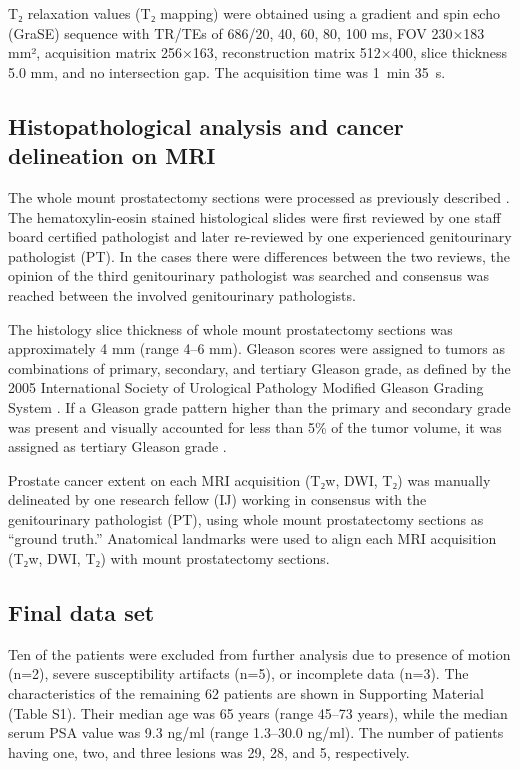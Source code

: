 T₂ relaxation values (T₂ mapping) were obtained using a gradient and spin echo
(GraSE) sequence with TR/TEs of 686/20, 40, 60, 80, 100 ms, FOV 230×183 mm²,
acquisition matrix 256×163, reconstruction matrix 512×400, slice thickness 5.0
mm, and no intersection gap. The acquisition time was 1~min 35~s.


\subsection{Histopathological analysis and cancer delineation on MRI}

The whole mount prostatectomy sections were processed as previously described
\citep{Jambor2015Evaluation, Jambor2015Rotating}. The hematoxylin-eosin stained
histological slides were first reviewed by one staff board certified pathologist
and later re-reviewed by one experienced genitourinary pathologist (PT). In the
cases there were differences between the two reviews, the opinion of the third
genitourinary pathologist was searched and consensus was reached between the
involved genitourinary pathologists.

The histology slice thickness of whole mount prostatectomy sections was
approximately 4 mm (range 4--6 mm). Gleason scores were assigned to tumors as
combinations of primary, secondary, and tertiary Gleason grade, as defined by
the 2005 International Society of Urological Pathology Modified Gleason Grading
System \citep{Epstein2005}. If a Gleason grade pattern higher than the primary
and secondary grade was present and visually accounted for less than 5\% of the
tumor volume, it was assigned as tertiary Gleason grade \citep{Epstein2010}.

Prostate cancer extent on each MRI acquisition (T₂w, DWI, T₂) was manually
delineated by one research fellow (IJ) working in consensus with the
genitourinary pathologist (PT), using whole mount prostatectomy sections as
``ground truth.'' Anatomical landmarks were used to align each MRI acquisition
(T₂w, DWI, T₂) with mount prostatectomy sections.


\subsection{Final data set}

Ten of the patients were excluded from further analysis due to presence of
motion (n=2), severe susceptibility artifacts (n=5), or incomplete data (n=3).
The characteristics of the remaining 62 patients are shown in Supporting
Material (Table S1). Their median age was 65 years (range 45--73 years), while
the median serum PSA value was 9.3 ng/ml (range 1.3--30.0 ng/ml). The number of
patients having one, two, and three lesions was 29, 28, and 5, respectively.

